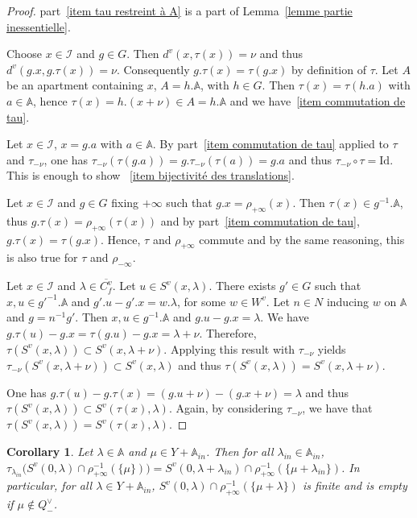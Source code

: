 \documentclass[12pt]{article}
\theoremstyle{plain}
\newtheorem{corollary}[theorem]{Corollary}
\theoremstyle{definition}
\newcommand{\A}{\mathbb{A}}
\newcommand{\I}{\mathcal{I}}
\newcommand{\Id}{\mathrm{Id}}
\begin{document}
\begin{proof} part~\ref{item tau restreint à A} is a part of Lemma~\ref{lemme partie inessentielle}.


Choose $x\in \I$ and $g\in G$. Then $d^v(x,\tau(x))=\nu$ and thus $d^v(g.x,g.\tau(x))=\nu$. Consequently $g.\tau(x)=\tau(g.x)$ by definition of $\tau$. Let $A$ be an apartment containing $x$, $A=h.\A$, with $h\in G$. Then $\tau(x)=\tau(h.a)$ with $a\in \A$, hence $\tau(x)=h.(x+\nu)\in A=h.\A$ and we have~\ref{item commutation de tau}.

Let $x\in\I$, $x=g.a$ with $a\in \A$. By part~\ref{item commutation de tau} applied to $\tau$ and $\tau_{-\nu}$, one has $\tau_{-\nu}(\tau(g.a))=g.\tau_{-\nu}(\tau(a))=g.a$ and thus $\tau_{-\nu}\circ\tau=\Id$. This is enough to show ~\ref{item bijectivité des translations}.

Let $x\in \I$ and $g\in G$ fixing $+\infty$ such that $g.x=\rho_{+\infty}(x)$. 
Then $\tau(x)\in g^{-1}.\A$, thus $g.\tau(x)=\rho_{+\infty}(\tau(x))$ and by
 part~\ref{item commutation de tau}, $g.\tau(x)=\tau(g.x)$. Hence, $\tau$ and
  $\rho_{+\infty}$ commute and by the same reasoning, this is also true for $\tau$ and $\rho_{-\infty}$.

Let $x\in\I$ and $\lambda\in \overline{C_f^v}$. Let $u\in S^v(x,\lambda)$. There exists $g'\in G$ such that $x,u\in g'^{-1}.\A$ and $g'.u-g'.x=w.\lambda$, for some $w\in W^v$. Let $n\in N$ inducing $w$ on $\A$ and $g=n^{-1}g'$. Then $x,u\in g^{-1}.\A$ and $g.u-g.x=\lambda$. We have $g.\tau(u)-g.x=\tau(g.u)-g.x=\lambda+\nu$. Therefore, $\tau(S^v(x,\lambda))\subset S^v(x,\lambda+\nu)$. Applying this result with $\tau_{-\nu}$ yields $\tau_{-\nu}(S^v(x,\lambda+\nu))\subset S^v(x,\lambda)$ and thus $\tau(S^v(x,\lambda))=S^v(x,\lambda+\nu)$.

One has $g.\tau(u)-g.\tau(x)=(g.u+\nu)-(g.x+\nu)=\lambda$ and thus $\tau(S^v(x,\lambda))\subset S^v(\tau(x),\lambda)$. Again, by considering $\tau_{-\nu}$, we have that $\tau(S^v(x,\lambda))=S^v(\tau(x),\lambda)$.  
\end{proof}

 
 
\begin{corollary}\label{cor finitude des boules}
Let $\lambda\in \A$ and $\mu\in Y+\A_{in}$. Then for all $\lambda_{in}\in \A_{in}$, $\tau_{\lambda_{in}}\big(S^v(0,\lambda)\cap \rho_{+\infty}^{-1}(\{\mu\})\big)=S^v(0,\lambda+\lambda_{in})\cap \rho_{+\infty}^{-1}(\{\mu+\lambda_{in}\})$. In particular, for all $\lambda\in Y+\A_{in}$, $S^v(0,\lambda)\cap \rho_{+\infty}^{-1}(\{\mu+\lambda\})$ is finite and is empty if $\mu\notin Q^\vee_-$.

\end{corollary}
\end{document}

